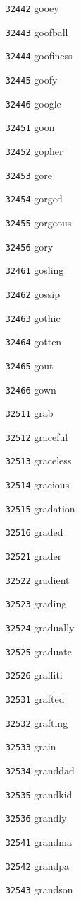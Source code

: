\documentclass[twoside,11pt]{article}
\begin{document}
\begin{multicols}{5}
\begin{enumerate}
\item[\texttt{32442}] gooey
\item[\texttt{32443}] goofball
\item[\texttt{32444}] goofiness
\item[\texttt{32445}] goofy
\item[\texttt{32446}] google
\item[\texttt{32451}] goon
\item[\texttt{32452}] gopher
\item[\texttt{32453}] gore
\item[\texttt{32454}] gorged
\item[\texttt{32455}] gorgeous
\item[\texttt{32456}] gory
\item[\texttt{32461}] gosling
\item[\texttt{32462}] gossip
\item[\texttt{32463}] gothic
\item[\texttt{32464}] gotten
\item[\texttt{32465}] gout
\item[\texttt{32466}] gown
\item[\texttt{32511}] grab
\item[\texttt{32512}] graceful
\item[\texttt{32513}] graceless
\item[\texttt{32514}] gracious
\item[\texttt{32515}] gradation
\item[\texttt{32516}] graded
\item[\texttt{32521}] grader
\item[\texttt{32522}] gradient
\item[\texttt{32523}] grading
\item[\texttt{32524}] gradually
\item[\texttt{32525}] graduate
\item[\texttt{32526}] graffiti
\item[\texttt{32531}] grafted
\item[\texttt{32532}] grafting
\item[\texttt{32533}] grain
\item[\texttt{32534}] granddad
\item[\texttt{32535}] grandkid
\item[\texttt{32536}] grandly
\item[\texttt{32541}] grandma
\item[\texttt{32542}] grandpa
\item[\texttt{32543}] grandson

\end{enumerate}
\end{multicols}
\end{document}

